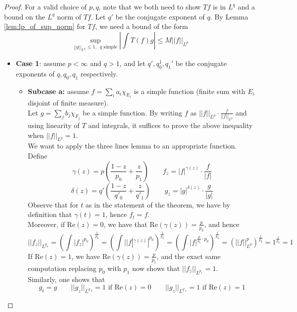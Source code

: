 \begin{proof}
  For a valid choice of $p,q$, note that we both need to show $Tf$ is in $L^q$ and a bound on the
  $L^q$ norm of $Tf$.
  Let $q'$ be the conjugate exponent of $q$. By Lemma \ref{lem:lp_of_sup_norm} for $Tf$, we need a bound of the form
  \[ \sup_{||g||_{L^{q'}} \leq 1, \ \ g \text{ simple}} \left| \int T(f) g \right| \leq M ||f||_{L^p} \]
  \begin{itemize}
    \item{\textbf{Case 1}: assume $p<\infty$ and $q>1$, and let $q', q_0^1, q_1'$ be the conjugate exponents of $q, q_0, q_1$ respectively.
    \begin{itemize}
        \item{\textbf{Subcase a:} assume $f=\sum_i a_i \chi_{E_i}$ is a simple function (finite sum with $E_i$ disjoint of finite measure).\\
        Let $g=\sum_j b_j \chi_{F_j}$ be a simple function.
        By writing $f$ as $||f||_{L^p} \cdot \frac{f}{||f||_{L^p}}$ and using linearity of $T$ and integrals, it suffices to prove the above inequality when $||f||_{L^p}=1$.\\
        We want to apply the three lines lemma to an appropriate function. Define
        \[ \gamma(z) = p \left(\frac{1-z}{p_0} + \frac{z}{p_1} \right) \qquad f_z = |f|^{\gamma(z)} \cdot \frac{f}{|f|} \]
        \[ \delta(z) = q' \left(\frac{1-z}{q'_0} + \frac{z}{q'_1} \right) \qquad g_z = |g|^{\delta(z)} \cdot \frac{g}{|g|} \]
        Observe that for $t$ as in the statement of the theorem, we have by definition that $\gamma(t)=1$, hence $f_t=f$.\\
        Moreover, if $\mathrm{Re}(z)=0$, we have that $\mathrm{Re} (\gamma(z)) = \frac{p}{p_0}$, and hence
        \[ ||f_z||_{L^{p_0}} = \left(\int |f_z|^{p_0}\right)^{\frac{1}{p_0}} = \left(\int | |f|^{\gamma(z)} |^{p_0}\right)^{\frac{1}{p_0}} = \left(\int |f| ^{\frac{p}{p_0} \cdot p_0}\right)^{\frac{1}{p_0}} = \left(||f||_{L^p}^p\right)^{\frac{1}{p_0}} = 1^{\frac{1}{p_0}} = 1  \]
        If $\mathrm{Re}(z)=1$, we have $\mathrm{Re} (\gamma(z)) = \frac{p}{p_1}$, and the exact same computation replacing $p_0$ with $p_1$ now shows that $||f_z||_{L^{p_1}}=1$.\\
        Similarly, one shows that
        \[ g_t=g \qquad ||g_z||_{L^{q'_0}} = 1 \text{ if } \mathrm{Re}(z)=0 \qquad ||g_z||_{L^{q'_1}} = 1 \text{ if } \mathrm{Re}(z)=1 \]
}
\end{itemize}}
\end{itemize}
\end{proof}
